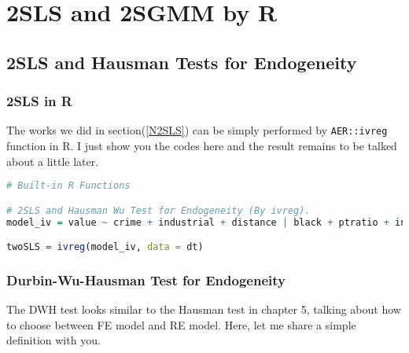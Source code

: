 \documentclass{article}
\theoremstyle{definition}
\begin{document}
\newpage
\section{2SLS and 2SGMM by R}

\subsection{2SLS and Hausman Tests for Endogeneity}

\subsubsection{2SLS in R}
The works we did in section(\ref{N2SLS}) can be simply performed by \texttt{AER::ivreg} function in R. I just show you the codes here and the result remains to be talked about a little later.
\begin{lstlisting}[language=R]
# Built-in R Functions

# 2SLS and Hausman Wu Test for Endogeneity (By ivreg).
model_iv = value ~ crime + industrial + distance | black + ptratio + industrial + distance

twoSLS = ivreg(model_iv, data = dt)
\end{lstlisting}

\subsubsection{Durbin-Wu-Hausman Test for Endogeneity}
The DWH test looks similar to the Hausman test in chapter 5, talking about how to choose between FE model and RE model. Here, let me share a simple definition with you.
\end{document}
